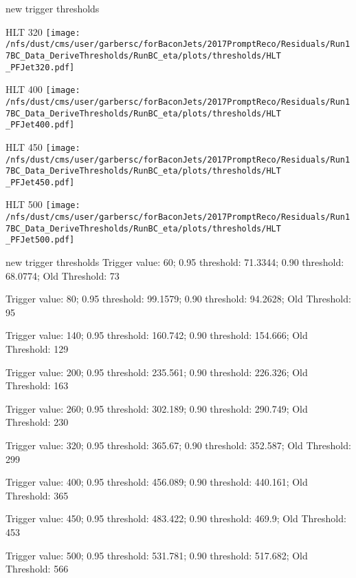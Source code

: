 \documentclass[t,compress]{beamer}
\begin{document}
\begin{frame}{new trigger thresholds}
\begin{minipage}{0.19\textwidth}
\tiny HLT  320
 \newline
	\texttt{[image: /nfs/dust/cms/user/garbersc/forBaconJets/2017PromptReco/Residuals/Run17BC\_Data\_DeriveThresholds/RunBC\_eta/plots/thresholds/HLT\\\_PFJet320.pdf]}
\end{minipage}
\begin{minipage}{0.19\textwidth}
\tiny HLT  400
 \newline
	\texttt{[image: /nfs/dust/cms/user/garbersc/forBaconJets/2017PromptReco/Residuals/Run17BC\_Data\_DeriveThresholds/RunBC\_eta/plots/thresholds/HLT\\\_PFJet400.pdf]}
\end{minipage}
\begin{minipage}{0.19\textwidth}
\tiny HLT  450
 \newline
	\texttt{[image: /nfs/dust/cms/user/garbersc/forBaconJets/2017PromptReco/Residuals/Run17BC\_Data\_DeriveThresholds/RunBC\_eta/plots/thresholds/HLT\\\_PFJet450.pdf]}
\end{minipage}
\begin{minipage}{0.19\textwidth}
\tiny HLT  500
 \newline
	\texttt{[image: /nfs/dust/cms/user/garbersc/forBaconJets/2017PromptReco/Residuals/Run17BC\_Data\_DeriveThresholds/RunBC\_eta/plots/thresholds/HLT\\\_PFJet500.pdf]}
\end{minipage}
\end{frame}

\begin{frame}{new trigger thresholds}
Trigger value: 60; 0.95 threshold: 71.3344; 0.90 threshold: 68.0774; Old Threshold: 73
 \newline

Trigger value: 80; 0.95 threshold: 99.1579; 0.90 threshold: 94.2628; Old Threshold: 95
\newline

Trigger value: 140; 0.95 threshold: 160.742; 0.90 threshold: 154.666; Old Threshold: 129
\newline

Trigger value: 200; 0.95 threshold: 235.561; 0.90 threshold: 226.326; Old Threshold: 163
\newline

Trigger value: 260; 0.95 threshold: 302.189; 0.90 threshold: 290.749; Old Threshold: 230
\newline

Trigger value: 320; 0.95 threshold: 365.67; 0.90 threshold: 352.587; Old Threshold: 299
\newline

Trigger value: 400; 0.95 threshold: 456.089; 0.90 threshold: 440.161; Old Threshold: 365
\newline

Trigger value: 450; 0.95 threshold: 483.422; 0.90 threshold: 469.9; Old Threshold: 453
\newline

Trigger value: 500; 0.95 threshold: 531.781; 0.90 threshold: 517.682; Old Threshold: 566
\newline

\end{frame}
\end{document}
